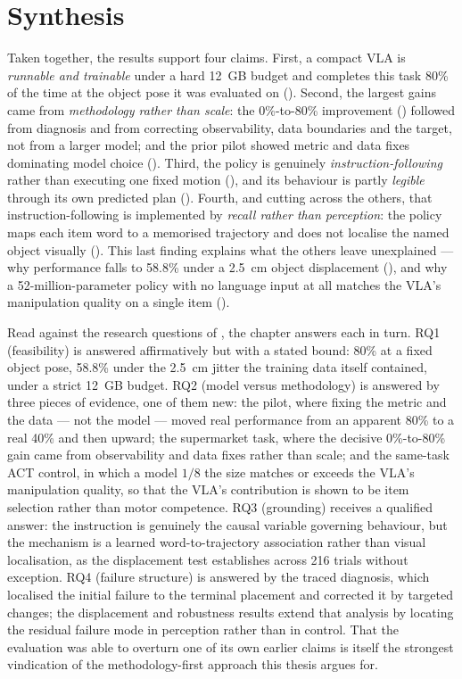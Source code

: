 \section{Synthesis}
\label{sec:results-synthesis}
Taken together, the results support four claims. First, a compact VLA is
\emph{runnable and trainable} under a hard 12~GB budget and completes this task 80\% of
the time at the object pose it was evaluated on
(). Second, the largest gains came from
\emph{methodology rather than scale}: the 0\%-to-80\% improvement
() followed from diagnosis and from correcting
observability, data boundaries and the target, not from a larger model; and the
prior pilot showed metric and data fixes dominating model choice
(). Third, the policy is genuinely
\emph{instruction-following} rather than executing one fixed motion
(), and its behaviour is partly \emph{legible} through
its own predicted plan (). Fourth, and cutting across
the others, that instruction-following is implemented by \emph{recall rather than
perception}: the policy maps each item word to a memorised trajectory and does not
localise the named object visually (). This last finding
explains what the others leave unexplained --- why performance falls to 58.8\% under a
\SI{2.5}{cm} object displacement (), and why a
52-million-parameter policy with no language input at all matches the VLA's
manipulation quality on a single item ().

Read against the research questions of , the chapter answers each in
turn. RQ1 (feasibility) is answered affirmatively but with a stated bound: 80\% at a
fixed object pose, 58.8\% under the \SI{2.5}{cm} jitter the training data itself
contained, under a strict 12~GB budget. RQ2 (model versus methodology) is answered by
three pieces of evidence, one of them new: the pilot, where fixing the metric and the
data --- not the model --- moved real performance from an apparent 80\% to a real 40\%
and then upward; the supermarket task, where the decisive 0\%-to-80\% gain came from
observability and data fixes rather than scale; and the same-task ACT control, in
which a model $1/8$ the size matches or exceeds the VLA's manipulation quality, so
that the VLA's contribution is shown to be item selection rather than motor
competence. RQ3 (grounding) receives a qualified answer: the instruction is genuinely
the causal variable governing behaviour, but the mechanism is a learned
word-to-trajectory association rather than visual localisation, as the displacement
test establishes across 216 trials without exception. RQ4 (failure structure) is
answered by the traced diagnosis, which localised the initial failure to the terminal
placement and corrected it by targeted changes; the displacement and robustness
results extend that analysis by locating the residual failure mode in perception
rather than in control. That the evaluation was able to overturn one of its own
earlier claims is itself the strongest vindication of the methodology-first approach
this thesis argues for.
